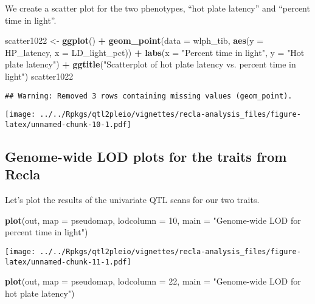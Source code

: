 \documentclass[oneside]{book}
\newenvironment{Shaded}{\begin{snugshade}}{\end{snugshade}}
\newcommand{\DataTypeTok}[1]{\textcolor[rgb]{0.13,0.29,0.53}{#1}}
\newcommand{\DecValTok}[1]{\textcolor[rgb]{0.00,0.00,0.81}{#1}}
\newcommand{\KeywordTok}[1]{\textcolor[rgb]{0.13,0.29,0.53}{\textbf{#1}}}
\newcommand{\NormalTok}[1]{#1}
\newcommand{\OperatorTok}[1]{\textcolor[rgb]{0.81,0.36,0.00}{\textbf{#1}}}
\newcommand{\StringTok}[1]{\textcolor[rgb]{0.31,0.60,0.02}{#1}}
\begin{document}
We create a scatter plot for the two phenotypes, ``hot plate latency''
and ``percent time in light''.

\begin{Shaded}
\begin{Highlighting}[]
\NormalTok{scatter1022 <-}\StringTok{ }\KeywordTok{ggplot}\NormalTok{() }\OperatorTok{+}\StringTok{ }\KeywordTok{geom_point}\NormalTok{(}\DataTypeTok{data =}\NormalTok{ wlph_tib, }\KeywordTok{aes}\NormalTok{(}\DataTypeTok{y =}\NormalTok{ HP_latency, }\DataTypeTok{x =}\NormalTok{ LD_light_pct)) }\OperatorTok{+}\StringTok{ }\KeywordTok{labs}\NormalTok{(}\DataTypeTok{x =} \StringTok{"Percent time in light"}\NormalTok{, }\DataTypeTok{y =} \StringTok{"Hot plate latency"}\NormalTok{) }\OperatorTok{+}\StringTok{ }\KeywordTok{ggtitle}\NormalTok{(}\StringTok{"Scatterplot of hot plate latency vs. percent time in light"}\NormalTok{)}
\NormalTok{scatter1022}
\end{Highlighting}
\end{Shaded}

\begin{verbatim}
## Warning: Removed 3 rows containing missing values (geom_point).
\end{verbatim}

\texttt{[image: ../../Rpkgs/qtl2pleio/vignettes/recla-analysis\_files/figure-latex/unnamed-chunk-10-1.pdf]}

\hypertarget{genome-wide-lod-plots-for-the-traits-from-recla}{%
\subsection{Genome-wide LOD plots for the traits from
Recla}\label{genome-wide-lod-plots-for-the-traits-from-recla}}

Let's plot the results of the univariate QTL scans for our two traits.

\begin{Shaded}
\begin{Highlighting}[]
\KeywordTok{plot}\NormalTok{(out, }\DataTypeTok{map =}\NormalTok{ pseudomap, }\DataTypeTok{lodcolumn =} \DecValTok{10}\NormalTok{, }\DataTypeTok{main =} \StringTok{"Genome-wide LOD for percent time in light"}\NormalTok{)}
\end{Highlighting}
\end{Shaded}

\texttt{[image: ../../Rpkgs/qtl2pleio/vignettes/recla-analysis\_files/figure-latex/unnamed-chunk-11-1.pdf]}

\begin{Shaded}
\begin{Highlighting}[]
\KeywordTok{plot}\NormalTok{(out, }\DataTypeTok{map =}\NormalTok{ pseudomap, }\DataTypeTok{lodcolumn =} \DecValTok{22}\NormalTok{, }\DataTypeTok{main =} \StringTok{"Genome-wide LOD for hot plate latency"}\NormalTok{)}
\end{Highlighting}
\end{Shaded}
\end{document}

